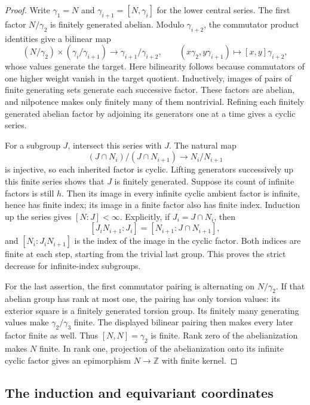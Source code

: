 \begin{proof}
Write $\gamma_1=N$ and $\gamma_{i+1}=[N,\gamma_i]$ for the lower
central series. The first factor $N/\gamma_2$ is finitely generated
abelian. Modulo $\gamma_{i+2}$, the commutator product identities give
a bilinear map
\[
 (N/\gamma_2)\times(\gamma_i/\gamma_{i+1})
 \longrightarrow\gamma_{i+1}/\gamma_{i+2},
 \qquad (x\gamma_2,y\gamma_{i+1})\longmapsto[x,y]\gamma_{i+2},
\]
whose values generate the target. Here bilinearity follows because
commutators of one higher weight vanish in the target quotient.
Inductively, images of pairs of finite generating sets generate each
successive factor. These factors are abelian, and nilpotence makes
only finitely many of them nontrivial. Refining each finitely generated
abelian factor by adjoining its generators one at a time gives a
cyclic series.

For a subgroup $J$, intersect this series with $J$. The natural map
\[
 (J\cap N_i)/(J\cap N_{i+1})\longrightarrow N_i/N_{i+1}
\]
is injective, so each inherited factor is cyclic. Lifting generators
successively up this finite series shows that $J$ is finitely generated.
Suppose its count of infinite factors is still $h$. Then its image in
every infinite cyclic ambient factor is infinite, hence has finite
index; its image in a finite factor also has finite index. Induction
up the series gives $[N:J]<\infty$. Explicitly, if
$J_i=J\cap N_i$, then
\[
 [J_iN_{i+1}:J_i]=[N_{i+1}:J\cap N_{i+1}],
\]
and $[N_i:J_iN_{i+1}]$ is the index of the image in the cyclic factor.
Both indices are finite at each step, starting from the trivial last
group. This proves the strict decrease for infinite-index subgroups.

For the last assertion, the first commutator pairing is alternating
on $N/\gamma_2$. If that abelian group has rank at most one, the
pairing has only torsion values: its exterior square is a finitely
generated torsion group. Its finitely many generating values make
$\gamma_2/\gamma_3$ finite. The displayed bilinear pairing then makes every later factor
finite as well. Thus $[N,N]=\gamma_2$ is finite. Rank zero of the
abelianization makes $N$ finite. In rank one, projection of the
abelianization onto its infinite cyclic factor gives an epimorphism
$N\to\mathbb Z$ with finite kernel.
\end{proof}

\subsection{The induction and equivariant coordinates}

